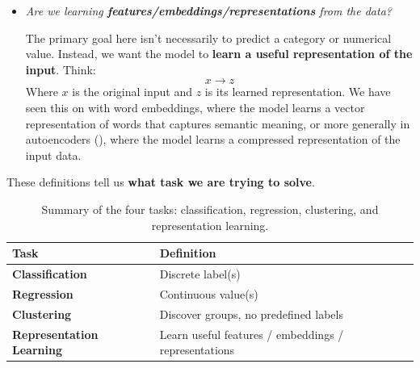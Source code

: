 \begin{itemize}
    \item {}
        \begin{center}
            \emph{Are we learning \textbf{features/embeddings/representations} from the data?}
        \end{center}
        The primary goal here isn't necessarily to predict a category or numerical value. Instead, we want the model to \textbf{learn a useful representation of the input}. Think:
        \begin{equation*}
            x \to z
        \end{equation*}
        Where $x$ is the original input and $z$ is its learned representation. We have seen this on  with word embeddings, where the model learns a vector representation of words that captures semantic meaning, or more generally in autoencoders (), where the model learns a compressed representation of the input data.
\end{itemize}
These definitions tell us \textbf{what task we are trying to solve}.

\begin{table}[!htp]
    \centering
    \begin{tabular}{@{} l p{18em} @{}}
        \toprule
        \textbf{Task} & \textbf{Definition} \\
        \midrule
        \textbf{Classification} & Discrete label(s) \\
        \textbf{Regression} & Continuous value(s) \\
        \textbf{Clustering} & Discover groups, no predefined labels \\
        \textbf{Representation Learning} & Learn useful features / embeddings / representations \\
        \bottomrule
    \end{tabular}
    \caption{Summary of the four tasks: classification, regression, clustering, and representation learning.}
\end{table}


